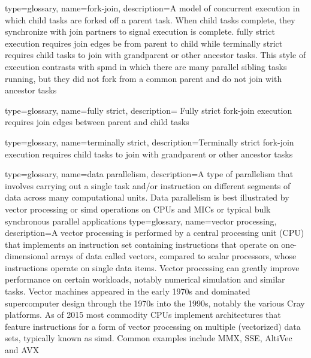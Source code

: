 {
  type=glossary,
  name={fork-join},
  description={A model of concurrent execution in which child tasks are forked
    off a parent task.  When child tasks complete, they synchronize with join
      partners to signal execution is complete.  \Gls{fully strict} execution
      requires join edges be from parent to child while \gls{terminally strict} requires child tasks to join with grandparent or other ancestor tasks. This style of execution contrasts with \gls{spmd} in which there are many parallel sibling tasks running, but they did not fork from a common parent and do not join with ancestor tasks}
}

{
  type=glossary,
  name={fully strict},
  description={ Fully strict \gls{fork-join} execution requires join edges between parent and
    child tasks} 
}

{
  type=glossary,
  name={terminally strict},
  description={Terminally strict \gls{fork-join} execution requires child tasks to join with
    grandparent or other ancestor tasks}
}

{
  type=glossary,
  name={data parallelism},
  description={A type of parallelism that involves carrying out a single task
    and/or instruction on different segments of data across many computational
      units. Data parallelism is best illustrated by \gls{vector processing} or \gls{simd} operations on
      \glspl{CPU} and \glspl{MIC} or typical \gls{bulk synchronous} parallel applications}
}
{
  type=glossary,
  name={vector processing},
  description={A vector processing is performed by a central
  processing unit (\gls{CPU}) that implements an instruction set containing
  instructions that operate on one-dimensional arrays of data called
  vectors, compared to scalar processors, whose instructions operate
  on single data items. Vector processing can greatly improve
  performance on certain workloads, notably numerical simulation and
  similar tasks. Vector machines appeared in the early 1970s and
  dominated supercomputer design through the 1970s into the 1990s,
  notably the various Cray platforms. As of 2015 most commodity \glspl{CPU}
  implement architectures that feature instructions for a form of
  vector processing on multiple (vectorized) data sets, typically
  known as \gls{simd}. Common examples include MMX, \gls{SSE},
  AltiVec and \gls{AVX}}
}


